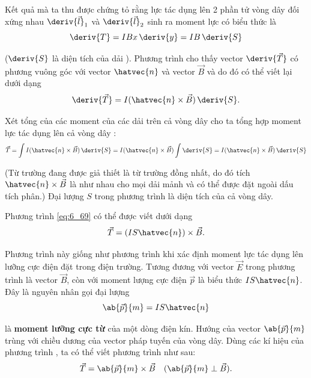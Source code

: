 Kết quả mà ta thu được chứng tỏ rằng lực tác dụng lên 2 phần tử vòng dây đối xứng nhau $\deriv{\vec{l}}_1$ và $\deriv{\vec{l}}_2$ sinh ra moment lực có biểu thức là
\begin{equation*}
    \deriv{T} = I B x\, \deriv{y} = I B\, \deriv{S}
\end{equation*}

\noindent
($\deriv{S}$  là diện tích của dải ). Phương trình   cho thấy vector  $\deriv{\vec{T}}$ có phương vuông góc với vector $\hatvec{n}$ và vector $\vec{B}$ và do đó có thể viết lại dưới dạng
\begin{equation*}
    \deriv{\vec{T}} = I (\hatvec{n} \times \vec{B})\, \deriv{S}.
\end{equation*}

\noindent
Xét tổng của các moment của các dải trên cả vòng dây cho ta tổng hợp moment lực tác dụng lên cả vòng dây :
\begin{equation}\label{eq:6_69}
    \vec{T} = \int I (\hatvec{n} \times \vec{B})\, \deriv{S} = I (\hatvec{n} \times \vec{B}) \int \deriv{S} = I (\hatvec{n} \times \vec{B})\, \deriv{S}
\end{equation}

\noindent
(Từ trường đang được giả thiết là từ trường đồng nhất, do đó tích  $\hatvec{n}\times\vec{B}$ là như nhau cho mọi dải mảnh và có thể được đặt ngoài dấu tích phân.)   Đại lượng $S$ trong phương trình  là diện tích của cả vòng dây.

Phương trình \eqref{eq:6_69} có thể được viết dưới dạng
\begin{equation}\label{eq:6_70}
    \vec{T} = (I S \hatvec{n}) \times \vec{B}.
\end{equation}

\noindent
Phương trình này giống như phương trình  khi xác định moment lực tác dụng lên lưỡng cực điện đặt trong điện trường. Tương đương với vector $\vec{E}$ trong phương trình  là vector $\vec{B}$, còn với moment lượng cực điện $\vec{p}$ là biểu thức $IS\hatvec{n}$. Đây là nguyên nhân gọi đại lượng
\begin{equation}\label{eq:6_71}
    \ab{\vec{p}}{m} = I S \hatvec{n}
\end{equation}

\noindent
 là  \textbf{ moment lưỡng cực từ} của một dòng điện kín. Hướng của vector $\ab{\vec{p}}{m}$  trùng với chiều dương của vector pháp tuyến của vòng dây. 
Dùng các kí hiệu của phương trình , ta có thể viết phương trình  như sau:
\begin{equation}\label{eq:6_72}
    \vec{T} = \ab{\vec{p}}{m} \times \vec{B}\quad (\ab{\vec{p}}{m} \perp \vec{B}).
\end{equation}

